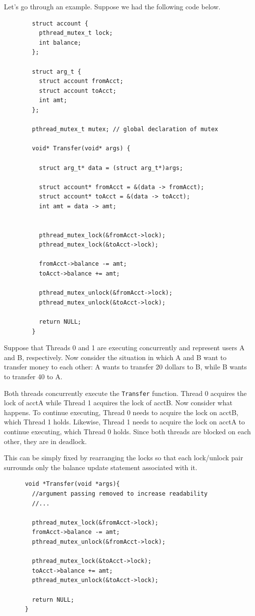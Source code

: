 \documentclass{article}
\newcounter{example}[section]
\newcounter{code}[section]
\begin{document}
    \begin{example}
      \label{ex:bank-accounts}
      Let's go through an example. Suppose we had the following code below. 
      \begin{lstlisting}
        struct account {
          pthread_mutex_t lock; 
          int balance; 
        }; 

        struct arg_t {
          struct account fromAcct; 
          struct account toAcct; 
          int amt; 
        }; 

        pthread_mutex_t mutex; // global declaration of mutex

        void* Transfer(void* args) {

          struct arg_t* data = (struct arg_t*)args; 

          struct account* fromAcct = &(data -> fromAcct); 
          struct account* toAcct = &(data -> toAcct); 
          int amt = data -> amt; 


          pthread_mutex_lock(&fromAcct->lock);
          pthread_mutex_lock(&toAcct->lock);

          fromAcct->balance -= amt;
          toAcct->balance += amt;

          pthread_mutex_unlock(&fromAcct->lock);
          pthread_mutex_unlock(&toAcct->lock);

          return NULL; 
        }
      \end{lstlisting}
      Suppose that Threads 0 and 1 are executing concurrently and represent users A and B, respectively. Now consider the situation in which A and B want to transfer money to each other: A wants to transfer 20 dollars to B, while B wants to transfer 40 to A.

      Both threads concurrently execute the \texttt{Transfer} function. Thread 0 acquires the lock of acctA while Thread 1 acquires the lock of acctB. Now consider what happens. To continue executing, Thread 0 needs to acquire the lock on acctB, which Thread 1 holds. Likewise, Thread 1 needs to acquire the lock on acctA to continue executing, which Thread 0 holds. Since both threads are blocked on each other, they are in deadlock.

      This can be simply fixed by rearranging the locks so that each lock/unlock pair surrounds only the balance update statement associated with it. 
      \begin{lstlisting}
      void *Transfer(void *args){
        //argument passing removed to increase readability
        //...

        pthread_mutex_lock(&fromAcct->lock);
        fromAcct->balance -= amt;
        pthread_mutex_unlock(&fromAcct->lock);

        pthread_mutex_lock(&toAcct->lock);
        toAcct->balance += amt;
        pthread_mutex_unlock(&toAcct->lock);

        return NULL;
      } 
      \end{lstlisting}
    \end{example}
\end{document}

